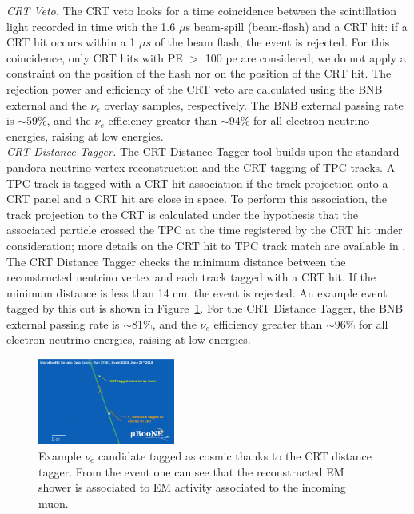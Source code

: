\emph{CRT Veto.} %
The CRT veto looks for a time coincidence between the scintillation light recorded in time with the 1.6 $\mu$s beam-spill (beam-flash) and a CRT hit: if a CRT hit occurs within a 1 $\mu s$ of the beam flash, the event is rejected. For this coincidence, only CRT hits with PE $>$ 100 pe are considered; we do not apply a constraint on the position of the flash nor on the position of the CRT hit. 
The rejection power and efficiency of the CRT veto are calculated using the BNB external and the $\nu_e$ overlay samples, respectively. The BNB external passing rate is $\sim$59\%,  and the $\nu_e$ efficiency greater than $\sim$94\% for all electron neutrino energies, raising at low energies. \\


\emph{CRT Distance Tagger.} 
The CRT Distance Tagger tool builds upon the standard pandora neutrino vertex reconstruction and the CRT tagging of TPC tracks. A TPC track is tagged with a CRT hit association if the track projection onto a CRT panel and a CRT hit are close in space. 
To perform this association, the track projection to the CRT is calculated under the hypothesis that the associated particle crossed the TPC at the time registered by the CRT hit under consideration; more details on the CRT hit to TPC track match are available in \cite{bib:CRTPresel_Technote}.  The CRT Distance Tagger checks the minimum distance between the reconstructed neutrino vertex and each track tagged with a CRT hit. If the minimum distance is less than 14 cm, the event is rejected. An example event tagged by this cut is shown in Figure~\ref{fig:crtdist00}.  For the CRT Distance Tagger, the BNB external passing rate is $\sim$81\%,  and the $\nu_e$ efficiency greater than $\sim$96\% for all electron neutrino energies, raising at low energies. \\
 
\begin{figure}[h!]
\centering
\includegraphics[width=0.4\textwidth]{NuId-Ch3/Images/crttagger_01.png}
\caption{Example $\nu_e$ candidate tagged as cosmic thanks to the CRT distance tagger. From the event one can see that the reconstructed EM shower is associated to EM activity associated to the incoming muon.}
\label{fig:crtdist00}
\end{figure}

